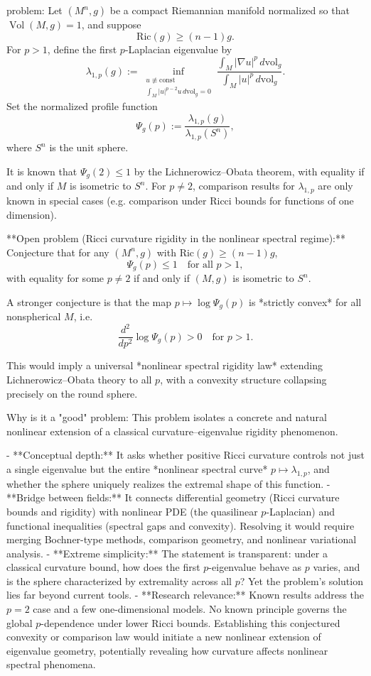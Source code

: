 problem:  
Let \((M^n,g)\) be a compact Riemannian manifold normalized so that \(\operatorname{Vol}(M,g)=1\), and suppose  
\[
\mathrm{Ric}(g) \ge (n-1)g.
\]
For \(p>1\), define the first \(p\)-Laplacian eigenvalue by
\[
\lambda_{1,p}(g)
:= \inf_{\substack{u\not\equiv \text{const}\\ \int_M |u|^{p-2}u\,d\mathrm{vol}_g=0}}
\frac{\int_M |\nabla u|^p\,d\mathrm{vol}_g}
     {\int_M |u|^p\,d\mathrm{vol}_g}.
\]
Set the normalized profile function
\[
\Psi_g(p) := \frac{\lambda_{1,p}(g)}{\lambda_{1,p}(S^n)},
\]
where \(S^n\) is the unit sphere.

It is known that \(\Psi_g(2)\le 1\) by the Lichnerowicz–Obata theorem, with equality if and only if \(M\) is isometric to \(S^n\). For \(p\ne 2\), comparison results for \(\lambda_{1,p}\) are only known in special cases (e.g. comparison under Ricci bounds for functions of one dimension).

**Open problem (Ricci curvature rigidity in the nonlinear spectral regime):**  
Conjecture that for any \((M^n,g)\) with \(\mathrm{Ric}(g)\ge (n-1)g\),
\[
\Psi_g(p) \le 1 \quad \text{for all } p>1,
\]
with equality for some \(p\neq2\) if and only if \((M,g)\) is isometric to \(S^n\).  

A stronger conjecture is that the map \(p\mapsto \log \Psi_g(p)\) is *strictly convex* for all nonspherical \(M\), i.e.
\[
\frac{d^2}{dp^2}\log \Psi_g(p) > 0 \quad \text{for } p>1.
\]

This would imply a universal *nonlinear spectral rigidity law* extending Lichnerowicz–Obata theory to all \(p\), with a convexity structure collapsing precisely on the round sphere.

Why is it a "good" problem:  
This problem isolates a concrete and natural nonlinear extension of a classical curvature–eigenvalue rigidity phenomenon.  

- **Conceptual depth:** It asks whether positive Ricci curvature controls not just a single eigenvalue but the entire *nonlinear spectral curve* \(p \mapsto \lambda_{1,p}\), and whether the sphere uniquely realizes the extremal shape of this function.  
- **Bridge between fields:** It connects differential geometry (Ricci curvature bounds and rigidity) with nonlinear PDE (the quasilinear \(p\)-Laplacian) and functional inequalities (spectral gaps and convexity). Resolving it would require merging Bochner-type methods, comparison geometry, and nonlinear variational analysis.  
- **Extreme simplicity:** The statement is transparent: under a classical curvature bound, how does the first \(p\)-eigenvalue behave as \(p\) varies, and is the sphere characterized by extremality across all \(p\)? Yet the problem’s solution lies far beyond current tools.  
- **Research relevance:** Known results address the \(p=2\) case and a few one-dimensional models. No known principle governs the global \(p\)-dependence under lower Ricci bounds. Establishing this conjectured convexity or comparison law would initiate a new nonlinear extension of eigenvalue geometry, potentially revealing how curvature affects nonlinear spectral phenomena.